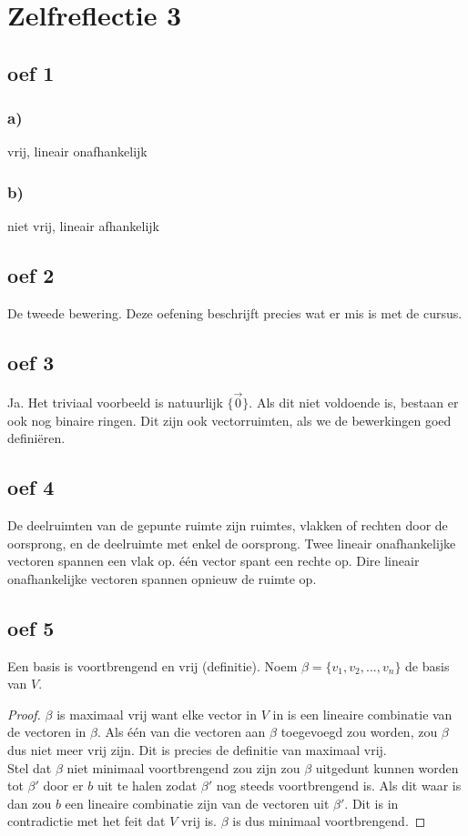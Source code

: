 \documentclass[lineaire_algebra_oplossingen.tex]{subfiles}
\begin{document}
\section{Zelfreflectie 3}
\subsection{oef 1}
\subsubsection*{a)}
vrij, lineair onafhankelijk
\subsubsection*{b)}
niet vrij, lineair afhankelijk

\subsection{oef 2}
De tweede bewering. Deze oefening beschrijft precies wat er mis is met de cursus.

\subsection{oef 3}
Ja. Het triviaal voorbeeld is natuurlijk $\{\vec{0}\}$. Als dit niet voldoende is, bestaan er ook nog binaire ringen. Dit zijn ook vectorruimten, als we de bewerkingen goed defini\"eren.

\subsection{oef 4}
De deelruimten van de gepunte ruimte zijn ruimtes, vlakken of rechten door de oorsprong, en de deelruimte met enkel de oorsprong. Twee lineair onafhankelijke vectoren spannen een vlak op. één vector spant een rechte op. Dire lineair onafhankelijke vectoren spannen opnieuw de ruimte op. 

\subsection{oef 5}
Een basis is voortbrengend en vrij (definitie). Noem $\beta = \{v_1,v_2,...,v_n\}$ de basis van $V$.
\begin{proof}
$\beta$ is maximaal vrij want elke vector in $V$ in is een lineaire combinatie van de vectoren in $\beta$. Als één van die vectoren aan $\beta$ toegevoegd zou worden, zou $\beta$ dus niet meer vrij zijn. Dit is precies de definitie van maximaal vrij.\\
Stel dat $\beta$ niet minimaal voortbrengend zou zijn zou $\beta$ uitgedunt kunnen worden tot $\beta'$ door er $b$ uit te halen zodat $\beta'$ nog steeds voortbrengend is. Als dit waar is dan zou $b$ een lineaire combinatie zijn van de vectoren uit $\beta'$. Dit is in contradictie met het feit dat $V$ vrij is. $\beta$ is dus minimaal voortbrengend.
\end{proof}
\end{document}
